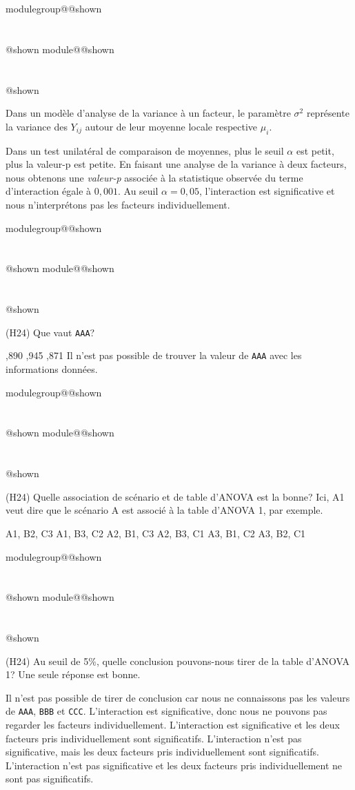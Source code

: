 \documentclass{Evaluation}
\makeatletter
\newcommand{\currentmodulekey}{}
\newcommand{\currentmoduletitle}{}
\newcommand{\currentgroupkey}{}
\newcommand{\currentgrouptitle}{}
\newcommand{\showmoduleifneeded}{%
  \ifx\currentgroupkey\empty\else
    \expandafter\ifx\csname modulegroup@\currentgroupkey @shown\endcsname\relax
      \section*{\currentgrouptitle}%
      \expandafter\gdef\csname modulegroup@\currentgroupkey @shown\endcsname{1}%
    \fi
  \fi
  \expandafter\ifx\csname module@\currentmodulekey @shown\endcsname\relax
    \section*{\currentmoduletitle}%
    \expandafter\gdef\csname module@\currentmodulekey @shown\endcsname{1}%
  \fi
}
\newenvironment{A23}{\showmoduleifneeded}{}
\newenvironment{H24}{\showmoduleifneeded}{}
\makeatother
\begin{document}
\begin{questions}
\begin{A23}
\begin{checkboxes}
\choice Dans un modèle d’analyse de la variance à un facteur, le paramètre $\sigma^2$ représente la variance
des $Y_{ij}$ autour de leur moyenne locale respective $\mu_i$.

\correctchoice Dans un test unilatéral de comparaison de moyennes, plus le seuil $\alpha$ est petit, plus la valeur-p est petite.
\choice En faisant une analyse de la variance à deux facteurs, nous obtenons une \textit{valeur-p} associée à la statistique observée du terme d'interaction égale à $0,001$. Au seuil $\alpha = 0,05$, l'interaction est significative et nous n'interprétons pas les facteurs individuellement.

\end{checkboxes}

\medskip
\end{A23}

\begin{H24}
\question
(H24) Que vaut \texttt{AAA}?
\begin{checkboxes}
    ,890
    ,945
    ,871
    \choice Il n'est pas possible de trouver la valeur de \texttt{AAA} avec les informations données.
\end{checkboxes}

\vspace{0.5cm}
\end{H24}

\begin{H24}
\question
(H24)  Quelle association de scénario et de table d'ANOVA est la bonne? Ici, A1 veut dire que le scénario A est associé à la table d'ANOVA 1, par exemple.

\begin{oneparcheckboxes}
    \choice A1, B2, C3
    \choice A1, B3, C2
    \choice A2, B1, C3
    \correctchoice A2, B3, C1
    \choice A3, B1, C2
    \choice A3, B2, C1
\end{oneparcheckboxes}

\vspace{0.5cm}
\end{H24}

\begin{H24}
\question
(H24) Au seuil de 5\%, quelle conclusion pouvons-nous tirer de la table d'ANOVA 1? Une seule réponse est bonne.
\begin{checkboxes}
    \choice Il n'est pas possible de tirer de conclusion car nous ne connaissons pas les valeurs de \texttt{AAA}, \texttt{BBB} et \texttt{CCC}.
    \choice L'interaction est significative, donc nous ne pouvons pas regarder les facteurs individuellement.
    \choice L'interaction est significative et les deux facteurs pris individuellement sont significatifs.
    \correctchoice L'interaction n'est pas significative, mais les deux facteurs pris individuellement sont significatifs.
    \choice L'interaction n'est pas significative et les deux facteurs pris individuellement ne sont pas significatifs.
\end{checkboxes}


\end{H24}
\end{questions}
\end{document}
